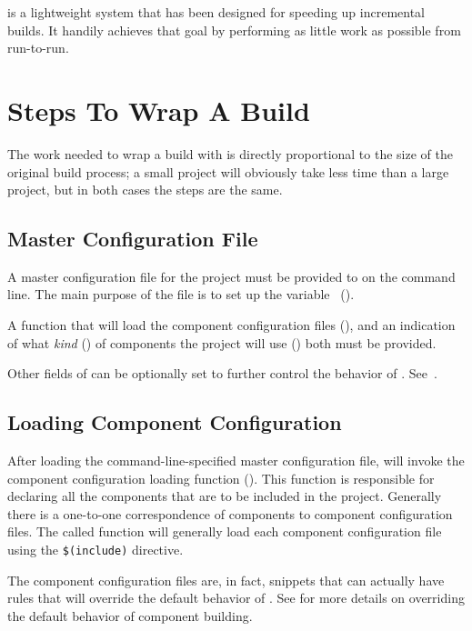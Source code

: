 \lmsbw is a lightweight system that has been designed for speeding up
incremental builds.  It handily achieves that goal by performing as
little work as possible from run-to-run.

\section{Steps To Wrap A Build}

The work needed to wrap a build with \lmsbw is directly proportional
to the size of the original build process; a small project will
obviously take less time than a large project, but in both cases the
steps are the same.

\subsection{Master Configuration File}

A master configuration file for the project must be provided to \lmsbw
on the command line.  The main purpose of the file is to set up the
\lmsbwconfiguration variable~ ().

A \gnumake function that will load the component configuration files
(), and an indication of
what \emph{kind} () of components the project
will use () both must be
provided.

Other fields of \lmsbwconfiguration can be optionally set to further
control the behavior of \lmsbw.
See~.

\subsection{Loading Component Configuration}

After loading the command-line-specified master configuration file,
\lmsbw will invoke the component configuration loading function
().  This function is
responsible for declaring all the components that are to be included
in the project.  Generally there is a one-to-one correspondence of
components to component configuration files.  The called function will
generally load each component configuration file using the \gnumake
\texttt{\$(include)} directive.

The component configuration files are, in fact, \makefile snippets
that can actually have rules that will override the default behavior
of \lmsbw.  See  for more details on overriding
the default behavior of component building.

